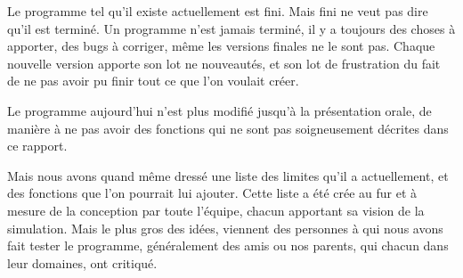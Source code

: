Le programme tel qu'il existe actuellement est fini. Mais fini ne veut pas dire qu'il est terminé.
Un programme n'est jamais terminé, il y a toujours des choses à apporter, des bugs à corriger, même les versions finales ne le sont pas. Chaque nouvelle version apporte son lot ne nouveautés, et son lot de frustration du fait de ne pas avoir pu finir tout ce que l'on voulait créer.

Le programme aujourd'hui n'est plus modifié jusqu'à la présentation orale, de manière à ne pas avoir des fonctions qui ne sont pas soigneusement décrites dans ce rapport.

Mais nous avons quand même dressé une liste des limites qu'il a actuellement, et des fonctions que l'on pourrait lui ajouter. Cette liste a été crée au fur et à mesure de la conception par toute l'équipe, chacun apportant sa vision de la simulation. Mais le plus gros des idées, viennent des personnes à qui nous avons fait tester le programme, généralement des amis ou nos parents, qui chacun dans leur domaines, ont critiqué.

